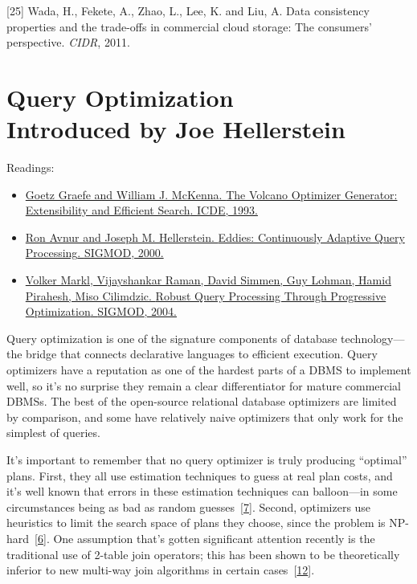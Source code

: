 \documentclass[b5paper,11pt,twoside,openright]{book}
\newcommand\Chapter[3]{
  \hypertarget{#1}{
    \chapter[#2]{#2\\{\Large #3}}
  }
}
\begin{document}
\leavevmode\hypertarget{ref-wada}{}%
{[}25{]} Wada, H., Fekete, A., Zhao, L., Lee, K. and Liu, A. Data
consistency properties and the trade-offs in commercial cloud storage:
The consumers' perspective. \emph{CIDR}, 2011.


\Chapter{ch7-queryoptimization}{%
Query Optimization
}{%
Introduced by Joe Hellerstein
}

\begin{framed}
Readings:
\begin{itemize}
\item
\href{https://scholar.google.com/scholar?cluster=2304531151126477511}{Goetz
  Graefe and William J. McKenna. {The Volcano Optimizer Generator:
    Extensibility and Efficient Search}. {ICDE}, 1993.}
\item
\href{https://scholar.google.com/scholar?cluster=13049208738754012194}{Ron
  Avnur and Joseph M. Hellerstein. {Eddies: Continuously Adaptive Query
    Processing}. {SIGMOD}, 2000.}
\item
\href{https://scholar.google.com/scholar?cluster=4929312332613352080}{Volker
  Markl, Vijayshankar Raman, David Simmen, Guy Lohman, Hamid Pirahesh,
  Miso Cilimdzic. {Robust Query Processing Through Progressive
    Optimization}. {SIGMOD}, 2004.}
\end{itemize}
\end{framed}

Query optimization is one of the signature components of database
technology---the bridge that connects declarative languages to efficient
execution. Query optimizers have a reputation as one of the hardest
parts of a DBMS to implement well, so it's no surprise they remain a
clear differentiator for mature commercial DBMSs. The best of the
open-source relational database optimizers are limited by comparison,
and some have relatively naive optimizers that only work for the
simplest of queries.

It's important to remember that no query optimizer is truly producing
``optimal'' plans. First, they all use estimation techniques to guess at
real plan costs, and it's well known that errors in these estimation
techniques can balloon---in some circumstances being as bad as random
guesses~{{[}\protect\hyperlink{ref-ic91}{7}{]}}. Second, optimizers use
heuristics to limit the search space of plans they choose, since the
problem is
NP-hard~{{[}\protect\hyperlink{ref-ibaraki1984optimal}{6}{]}}. One
assumption that's gotten significant attention recently is the
traditional use of 2-table join operators; this has been shown to be
theoretically inferior to new multi-way join algorithms in certain
cases~{{[}\protect\hyperlink{ref-ngo2012worst}{12}{]}}.
\end{document}
